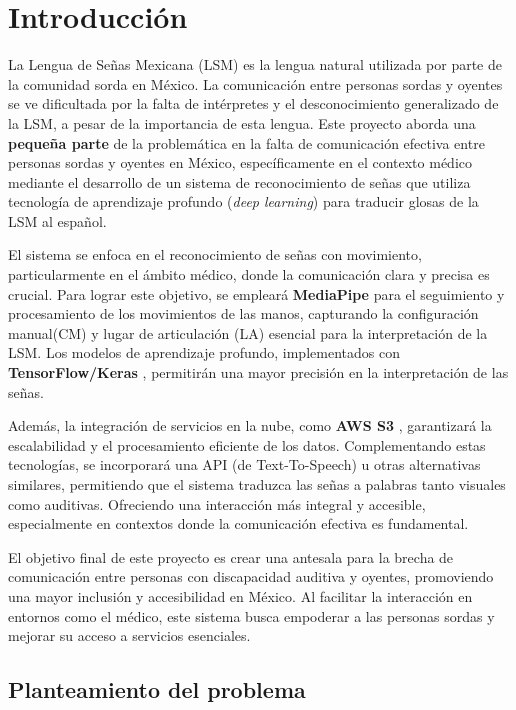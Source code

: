 \chapter{Introducción}
La Lengua de Señas Mexicana (LSM) es la lengua natural utilizada por parte de la comunidad sorda en México. La comunicación entre personas sordas y oyentes se ve dificultada por la falta de intérpretes y el desconocimiento generalizado de la LSM, a pesar de la importancia de esta lengua. Este proyecto aborda una \textbf{pequeña parte} de la problemática en la falta de comunicación efectiva entre personas sordas y oyentes en México, específicamente en el contexto médico mediante el desarrollo de un sistema de reconocimiento de señas que utiliza tecnología de aprendizaje profundo (\textit{deep learning}) para traducir glosas de la LSM al español.

El sistema se enfoca en el reconocimiento de señas con movimiento, particularmente en el ámbito médico, donde la comunicación clara y precisa es crucial. Para lograr este objetivo, se empleará \textbf{MediaPipe} \cite{ref3} para el seguimiento y procesamiento de los movimientos de las manos, capturando la configuración manual(CM) y lugar de articulación (LA) esencial para la interpretación de la LSM. Los modelos de aprendizaje profundo, implementados con \textbf{TensorFlow/Keras} \cite{ref4}, permitirán una mayor precisión en la interpretación de las señas.

Además, la integración de servicios en la nube, como \textbf{AWS S3} \cite{ref5}, garantizará la escalabilidad y el procesamiento eficiente de los datos. Complementando estas tecnologías, se incorporará una API (de Text-\allowbreak To-\allowbreak Speech) u otras alternativas similares, permitiendo que el sistema traduzca las señas a palabras tanto visuales como auditivas. Ofreciendo una interacción más integral y accesible, especialmente en contextos donde la comunicación efectiva es fundamental.

El objetivo final de este proyecto es crear una antesala para la brecha de comunicación entre personas con discapacidad auditiva y oyentes, promoviendo una mayor inclusión y accesibilidad en México. Al facilitar la interacción en entornos como el médico, este sistema busca empoderar a las personas sordas y mejorar su acceso a servicios esenciales.
\clearpage
\section{Planteamiento del problema}

